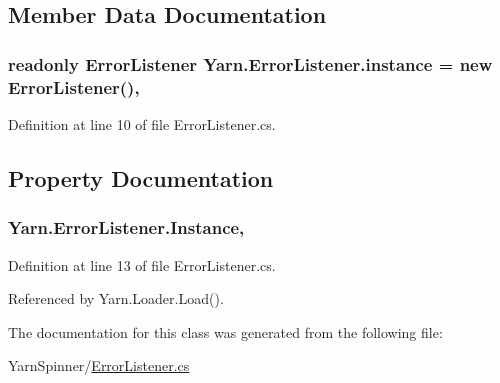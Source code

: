 \subsection{Member Data Documentation}
\hypertarget{a00094_a9421873edea84c51d5905f5a24c62479}{
\subsubsection[{instance}]{\setlength{\rightskip}{0pt plus 5cm}readonly {\bf Error\-Listener} Yarn.\-Error\-Listener.\-instance = new {\bf Error\-Listener}()\hspace{0.3cm}{\ttfamily [static]}, {\ttfamily [private]}}}\label{a00094_a9421873edea84c51d5905f5a24c62479}


Definition at line 10 of file Error\-Listener.\-cs.



\subsection{Property Documentation}
\hypertarget{a00094_a47b8f4f1d414afa1ea6067218c7ee34d}{
\subsubsection[{Instance}]{ Yarn.\-Error\-Listener.\-Instance\hspace{0.3cm}{\ttfamily [static]}, {\ttfamily [get]}}}\label{a00094_a47b8f4f1d414afa1ea6067218c7ee34d}


Definition at line 13 of file Error\-Listener.\-cs.



Referenced by Yarn.\-Loader.\-Load().



The documentation for this class was generated from the following file\-:\begin{DoxyCompactItemize}
\item 
Yarn\-Spinner/\hyperlink{a00297}{Error\-Listener.\-cs}\end{DoxyCompactItemize}
